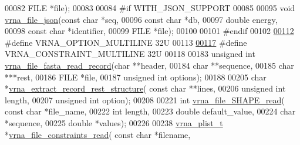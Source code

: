 \begin{DoxyCode}
00082                       FILE *file);
00083 
00084 \textcolor{preprocessor}{#if WITH\_JSON\_SUPPORT}
00085 
00095 \textcolor{keywordtype}{void} \hyperlink{group__file__utils_ga31f4a6c2ea1495a6e4f9eb45a9f6193d}{vrna\_file\_json}(\textcolor{keyword}{const} \textcolor{keywordtype}{char} *seq,
00096                     \textcolor{keyword}{const} \textcolor{keywordtype}{char} *db,
00097                     \textcolor{keywordtype}{double} energy,
00098                     \textcolor{keyword}{const} \textcolor{keywordtype}{char} *identifier,
00099                     FILE *file);
00100 
00101 \textcolor{preprocessor}{#endif}
00102 
\hypertarget{file__formats_8h_source_l00112}{}\hyperlink{group__file__utils_gabec89c09874528c6cb73140a4c3d86d7}{00112} \textcolor{preprocessor}{#define VRNA\_OPTION\_MULTILINE             32U}
00113 
\hypertarget{file__formats_8h_source_l00117}{}\hyperlink{group__file__utils_ga7d725ef525b29891abef3f1ed42599a4}{00117} \textcolor{preprocessor}{#define VRNA\_CONSTRAINT\_MULTILINE         32U}
00118 
00183 \textcolor{keywordtype}{unsigned} \textcolor{keywordtype}{int} \hyperlink{group__file__utils_ga8cfb7e271efc9e1f34640acb85475639}{vrna\_file\_fasta\_read\_record}(\textcolor{keywordtype}{char} **header,
00184                                     \textcolor{keywordtype}{char} **sequence,
00185                                     \textcolor{keywordtype}{char}  ***rest,
00186                                     FILE *file,
00187                                     \textcolor{keywordtype}{unsigned} \textcolor{keywordtype}{int} options);
00188 
00205 \textcolor{keywordtype}{char} *\hyperlink{group__file__utils_gad37cbb63a05eed63ba25c91628409be0}{vrna\_extract\_record\_rest\_structure}( \textcolor{keyword}{const} \textcolor{keywordtype}{char} **lines,
00206                                           \textcolor{keywordtype}{unsigned} \textcolor{keywordtype}{int} length,
00207                                           \textcolor{keywordtype}{unsigned} \textcolor{keywordtype}{int} option);
00208 
00221 \textcolor{keywordtype}{int} \hyperlink{group__file__utils_ga646ebf45450a69a7f2533f9ecd283a32}{vrna\_file\_SHAPE\_read}( \textcolor{keyword}{const} \textcolor{keywordtype}{char} *file\_name,
00222                           \textcolor{keywordtype}{int} length,
00223                           \textcolor{keywordtype}{double} default\_value,
00224                           \textcolor{keywordtype}{char} *sequence,
00225                           \textcolor{keywordtype}{double} *values);
00226 
00238 \hyperlink{group__data__structures_structvrna__plist__s}{vrna\_plist\_t} *\hyperlink{group__file__utils_gae33323c53765ecbbc410d9de2d495432}{vrna\_file\_constraints\_read}( \textcolor{keyword}{const} \textcolor{keywordtype}{char} *filename,

\end{DoxyCode}

